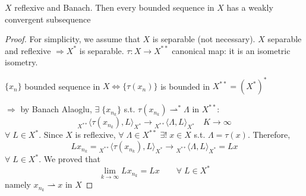 \begin{theorem}
    \(X\) reflexive and Banach. Then every bounded sequence in \(X\) has a weakly convergent subsequence
\end{theorem}

\begin{proof}
    For simplicity, we assume that \(X\) is separable (not necessary). \(X \) separable and reflexive \(\Rightarrow X^*\) is separable. \(\tau:X \to X^{**}\) canonical map: it is an isometric isometry.

    \(\{x_n\}\) bounded sequence in \(X \Leftrightarrow \{ \tau(x_n) \}\) is bounded in \(X^{**} = (X^*)^*\)
        
    \(\Rightarrow \) by Banach Alaoglu, \(\exists \; \{x_{n_k}\}\) s.t. \(\tau(x_{n_k})\rightharpoonup^* \Lambda \) in \(X^{**}\):
    \[
        {}_{X^{**}}\langle\tau(x_{n_k}), L \rangle_{X^*} \to {}_{X^{**}}\langle\Lambda, L \rangle_{X^*} \quad K \to \infty
    \]
    \(\forall\; L \in X^*.\) Since \(X\) is reflexive, \(\forall \; \Lambda \in X^{**} \) \(\exists ! \; x \in X\) s.t. \(\Lambda = \tau (x)\). Therefore, 
    \[
        L x_{n_k} = {}_{X^{**}}\langle\tau(x_{n_k}), L \rangle_{X^*} \to {}_{X^{**}}\langle \Lambda, L \rangle_{X^*} = Lx
    \]
    \(\forall\; L \in X^*\). We proved that 
    \[
        \lim_{k \to \infty} L x_{n_k} = Lx \qquad \forall\; L \in X^*
    \]
    namely \(x_{n_k} \rightharpoonup x\) in \(X\)
\end{proof}

